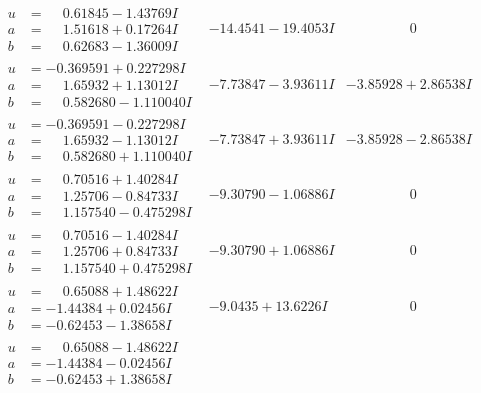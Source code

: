 \documentclass[1p]{elsarticle_modified}
\theoremstyle{definition}
\begin{document}
$$\begin{array}{c|c|c}
\begin{aligned}
u &= \phantom{-}0.61845 - 1.43769 I \\
a &= \phantom{-}1.51618 + 0.17264 I \\
b &= \phantom{-}0.62683 - 1.36009 I\end{aligned}
 & -14.4541 - 19.4053 I & \phantom{-0.000000 } 0 \\ \hline\begin{aligned}
u &= -0.369591 + 0.227298 I \\
a &= \phantom{-}1.65932 + 1.13012 I \\
b &= \phantom{-}0.582680 - 1.110040 I\end{aligned}
 & -7.73847 - 3.93611 I & -3.85928 + 2.86538 I \\ \hline\begin{aligned}
u &= -0.369591 - 0.227298 I \\
a &= \phantom{-}1.65932 - 1.13012 I \\
b &= \phantom{-}0.582680 + 1.110040 I\end{aligned}
 & -7.73847 + 3.93611 I & -3.85928 - 2.86538 I \\ \hline\begin{aligned}
u &= \phantom{-}0.70516 + 1.40284 I \\
a &= \phantom{-}1.25706 - 0.84733 I \\
b &= \phantom{-}1.157540 - 0.475298 I\end{aligned}
 & -9.30790 - 1.06886 I & \phantom{-0.000000 } 0 \\ \hline\begin{aligned}
u &= \phantom{-}0.70516 - 1.40284 I \\
a &= \phantom{-}1.25706 + 0.84733 I \\
b &= \phantom{-}1.157540 + 0.475298 I\end{aligned}
 & -9.30790 + 1.06886 I & \phantom{-0.000000 } 0 \\ \hline\begin{aligned}
u &= \phantom{-}0.65088 + 1.48622 I \\
a &= -1.44384 + 0.02456 I \\
b &= -0.62453 - 1.38658 I\end{aligned}
 & -9.0435 + 13.6226 I & \phantom{-0.000000 } 0 \\ \hline\begin{aligned}
u &= \phantom{-}0.65088 - 1.48622 I \\
a &= -1.44384 - 0.02456 I \\
b &= -0.62453 + 1.38658 I\end{aligned}

\end{array}$$
\end{document}

